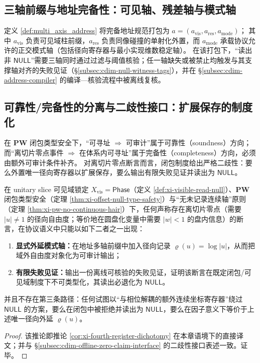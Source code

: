 \subsection{三轴前缀与地址完备性：可见轴、残差轴与模式轴}\label{subsec:cdim-three-axis-prefix-completeness}
定义 \ref{def:multi_axis_address} 将完备地址规范打包为
\(
a=(a_{\mathrm{vis}},a_{\mathrm{res}},a_{\mathrm{mode}})
\)；
其中 \(a_{\mathrm{vis}}\) 负责可见域柱前缀，\(a_{\mathrm{res}}\) 负责同像碰撞的单射化外置，而 \(a_{\mathrm{mode}}\) 承载协议允许的正交模式轴（包括径向寄存器与最小实现维数稳定轴）。
在该打包下，“读出非 \(\mathsf{NULL}\)”需要三轴同时通过过滤与阈值核验；任一轴缺失或被禁止均触发与其支撑轴对齐的失败见证（\S\ref{subsec:cdim-null-witness-tags}），并在 \S\ref{subsec:cdim-address-compiler} 的编译—核验流程中被离线复核。

\subsection{可靠性/完备性的分离与二歧性接口：扩展保存的制度化}\label{subsec:cdim-soundness-completeness-dichotomy}
在 \(\mathbf{PW}\) 闭包类型安全下，“可寻址 \(\Rightarrow\) 可审计”属于可靠性（soundness）方向；而“离切片零点事件 \(\Rightarrow\) 在体系内可寻址”属于完备性（completeness）方向，必须由额外可审计条件补齐。
对离切片零点断言而言，闭包制度给出严格二歧性：要么外置唯一径向寄存器以扩展保存，要么输出有限失败见证并读出为 \(\mathsf{NULL}\)。

\begin{corollary}\label{cor:cdim-fourth-register-dichotomy}
在 unitary slice 可见域锁定 \(X_{\mathrm{vis}}=\mathsf{Phase}\)（定义 \ref{def:xi-visible-read-null}）、\(\mathbf{PW}\) 闭包类型安全（定理 \ref{thm:xi-offset-null-type-safety}）与“无未记录连续轴”原则（定理 \ref{thm:xi-pw-no-continuous-hair}）下，任何声称存在离切片零点（需要 \(|u|\neq 1\) 的径向自由度；等价地在圆盘化变量中需要 \(|w|<1\) 的盘内信息）的断言，在协议语义中只能以如下二者之一出现：
\begin{enumerate}
  \item \textbf{显式外延模式轴：}在地址多轴前缀中加入径向记录 \(\varrho(u)=\log|u|\)，从而把域外自由度对象化为可审计输出；
  \item \textbf{有限失败见证：}输出一份离线可核验的失败见证，证明该断言在既定闭包/可见域制度下不可类型化，其读出必退化为 \(\mathsf{NULL}\)。
\end{enumerate}
并且不存在第三条路径：任何试图以“与相位解耦的额外连续坐标寄存器”绕过 \(\mathsf{NULL}\) 的方案，要么在闭包中被拒绝并读出为 \(\mathsf{NULL}\)，要么在因子意义下等价于上述唯一径向外延 \(\varrho(u)\)。
\end{corollary}
\begin{proof}
该推论即推论 \ref{cor:xi-fourth-register-dichotomy} 在本章语境下的直接译文；并与 \S\ref{subsec:cdim-offline-zero-claim-interface} 的二歧性接口表述一致。证毕。
\end{proof}

